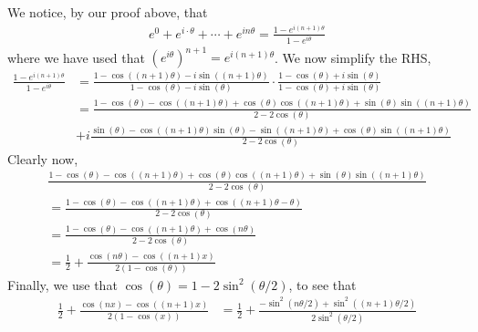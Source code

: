 \documentclass[12pt]{article}
\theoremstyle{definition}
\theoremstyle{remark}
\begin{document}
\begin{enumerate}[leftmargin=\labelsep]
		We notice, by our proof above, that
		\begin{align*}
			e^{0} + e^{i \cdot \theta} + \cdots + e^{i n \theta} = \frac{1-e^{i(n+1)\theta}}{1-e^{i\theta}}
		\end{align*}
		where we have used that $(e^{i\theta})^{n+1} = e^{i(n+1)\theta}$. We now simplify the RHS,
		\begin{align*}
			\frac{1-e^{i(n+1)\theta}}{1-e^{i\theta}} &= \frac{1-\cos((n+1)\theta)-i\sin((n+1)\theta)}{1-\cos(\theta)-i\sin(\theta)} \cdot \frac{1-\cos(\theta)+i\sin(\theta)}{1-\cos(\theta)+i\sin(\theta)} \\
			&= \frac{1-\cos(\theta)-\cos((n+1)\theta)+\cos(\theta)\cos((n+1)\theta)+\sin(\theta)\sin((n+1)\theta)}{2-2\cos(\theta)} \\ &+ i\frac{\sin(\theta)-\cos((n+1)\theta)\sin(\theta)-\sin((n+1)\theta)+\cos(\theta)\sin((n+1)\theta)}{2-2\cos(\theta)}
		\end{align*}
		Clearly now, 
		\begin{align*}
			\frac{1-\cos(\theta)-\cos((n+1)\theta)+\cos(\theta)\cos((n+1)\theta)+\sin(\theta)\sin((n+1)\theta)}{2-2\cos(\theta)} \\
			= \frac{1-\cos(\theta)-\cos((n+1)\theta)+\cos((n+1)\theta - \theta)}{2-2\cos(\theta)}\\
			= \frac{1-\cos(\theta)-\cos((n+1)\theta)+\cos(n\theta)}{2-2\cos(\theta)} \\
			= \frac 12 + \frac{\cos(n\theta) - \cos((n+1)x)}{2(1-\cos(\theta))}
		\end{align*}
		Finally, we use that $\cos(\theta) = 1 - 2\sin^2(\theta/2)$, to see that
		\begin{align*}
			\frac 12 + \frac{\cos(nx) - \cos((n+1)x)}{2(1-\cos(x))} &= \frac12 + \frac{-\sin^2(n\theta/2) + \sin^2((n+1)\theta/2)}{2\sin^2(\theta/2)}
		\end{align*}
		

\end{enumerate}
\end{document}
